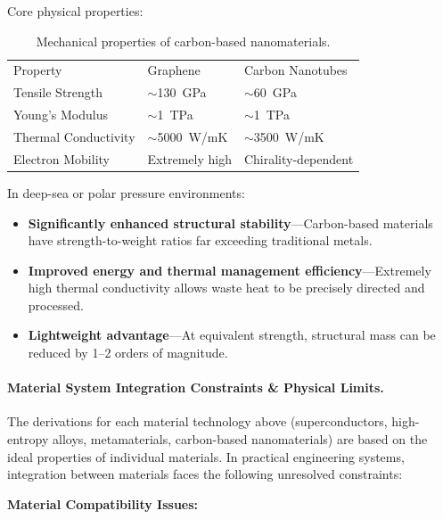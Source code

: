 \documentclass[aps,prd,twocolumn,superscriptaddress,nofootinbib]{revtex4-2}
\begin{document}
Core physical properties:

\begin{table}[htbp]
\caption{Mechanical properties of carbon-based nanomaterials.}
\label{tab:carbon-materials}
\begin{ruledtabular}
\begin{tabular}{lll}
Property & Graphene & Carbon Nanotubes \\
\colrule
Tensile Strength & ${\sim}$\SI{130}{GPa}~\cite{Lee2008} & ${\sim}$\SI{60}{GPa}~\cite{Yu2000} \\
Young's Modulus & ${\sim}$\SI{1}{TPa}~\cite{Lee2008} & ${\sim}$\SI{1}{TPa}~\cite{Yu2000} \\
Thermal Conductivity & ${\sim}$\SI{5000}{W/mK} & ${\sim}$\SI{3500}{W/mK} \\
Electron Mobility & Extremely high & Chirality-dependent \\
\end{tabular}
\end{ruledtabular}
\end{table}

In deep-sea or polar pressure environments:

\begin{itemize}
  \item \textbf{Significantly enhanced structural stability}---Carbon-based materials have strength-to-weight ratios far exceeding traditional metals.
  \item \textbf{Improved energy and thermal management efficiency}---Extremely high thermal conductivity allows waste heat to be precisely directed and processed.
  \item \textbf{Lightweight advantage}---At equivalent strength, structural mass can be reduced by 1--2 orders of magnitude.
\end{itemize}

\paragraph{Material System Integration Constraints \& Physical Limits.}\label{sec:material-limits}

The derivations for each material technology above (superconductors, high-entropy alloys, metamaterials, carbon-based nanomaterials) are based on the ideal properties of individual materials. In practical engineering systems, integration between materials faces the following unresolved constraints:

\textbf{Material Compatibility Issues:}
\end{document}
